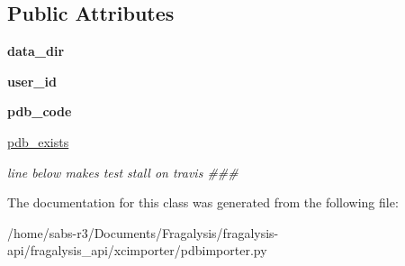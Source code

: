 \subsection*{Public Attributes}
\begin{DoxyCompactItemize}
\item 
\mbox{\label{classfragalysis__api_1_1xcimporter_1_1pdbimporter_1_1_import_pdb_a682ae0196455b3ba21d1f6f8083324ea}} 
{\bfseries data\+\_\+dir}
\item 
\mbox{\label{classfragalysis__api_1_1xcimporter_1_1pdbimporter_1_1_import_pdb_a4e8f2945727ef48feba2a568eab43b3b}} 
{\bfseries user\+\_\+id}
\item 
\mbox{\label{classfragalysis__api_1_1xcimporter_1_1pdbimporter_1_1_import_pdb_ab65dffc1f5b788b8d47cebf3a27ea08c}} 
{\bfseries pdb\+\_\+code}
\item 
\mbox{\label{classfragalysis__api_1_1xcimporter_1_1pdbimporter_1_1_import_pdb_a32f7fbde8f3a111497280a932de510e6}} 
\hyperlink{classfragalysis__api_1_1xcimporter_1_1pdbimporter_1_1_import_pdb_a32f7fbde8f3a111497280a932de510e6}{pdb\+\_\+exists}
\begin{DoxyCompactList}\small\item\em line below makes test stall on travis \#\#\# \end{DoxyCompactList}\end{DoxyCompactItemize}


The documentation for this class was generated from the following file\+:\begin{DoxyCompactItemize}
\item 
/home/sabs-\/r3/\+Documents/\+Fragalysis/fragalysis-\/api/fragalysis\+\_\+api/xcimporter/pdbimporter.\+py\end{DoxyCompactItemize}

